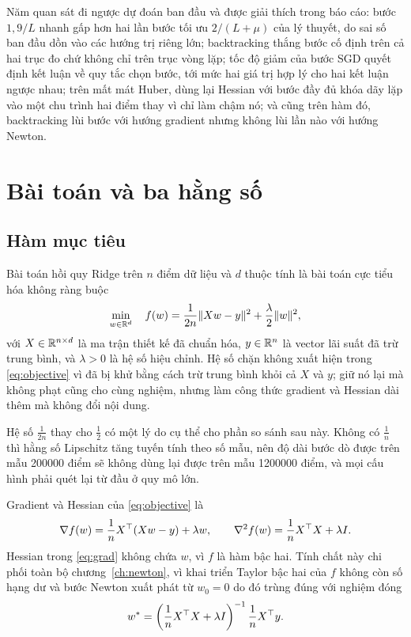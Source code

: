 \documentclass[12pt, a4paper, oneside]{report}
\theoremstyle{definition}
\begin{document}
Năm quan sát đi ngược dự đoán ban đầu và được giải thích trong báo cáo: bước
$1{,}9/L$ nhanh gấp hơn hai lần bước tối ưu $2/(L+\mu)$ của lý thuyết, do sai số
ban đầu dồn vào các hướng trị riêng lớn; backtracking thắng bước cố định trên cả
hai trục đo chứ không chỉ trên trục vòng lặp; tốc độ giảm của bước SGD quyết định
kết luận về quy tắc chọn bước, tới mức hai giá trị hợp lý cho hai kết luận ngược
nhau; trên mất mát Huber, dùng lại Hessian với bước đầy đủ khóa dãy lặp vào một
chu trình hai điểm thay vì chỉ làm chậm nó; và cũng trên hàm đó, backtracking lùi
bước với hướng gradient nhưng không lùi lần nào với hướng Newton.

\tableofcontents

\chapter{Bài toán và ba hằng số}

\section{Hàm mục tiêu}

Bài toán hồi quy Ridge \cite{hoerl1970ridge} trên $n$ điểm dữ liệu và $d$ thuộc
tính là bài toán cực tiểu hóa không ràng buộc
\begin{equation}\label{eq:objective}
  \min_{w \in \mathbb{R}^{d}} \quad f(w) = \frac{1}{2n} \lVert Xw - y\rVert^{2} + \frac{\lambda}{2} \lVert w\rVert^{2},
\end{equation}
với $X \in \mathbb{R}^{n \times d}$ là ma trận thiết kế đã chuẩn hóa, $y \in \mathbb{R}^{n}$ là
vector lãi suất đã trừ trung bình, và $\lambda > 0$ là hệ số hiệu chỉnh. Hệ số
chặn không xuất hiện trong \eqref{eq:objective} vì đã bị khử bằng cách trừ trung
bình khỏi cả $X$ và $y$; giữ nó lại mà không phạt cũng cho cùng nghiệm, nhưng làm
công thức gradient và Hessian dài thêm mà không đổi nội dung.

Hệ số $\frac{1}{2n}$ thay cho $\frac{1}{2}$ có một lý do cụ thể cho phần so sánh
sau này. Không có $\frac{1}{n}$ thì hằng số Lipschitz tăng tuyến tính theo số
mẫu, nên độ dài bước dò được trên mẫu \num{200000} điểm sẽ không dùng lại được
trên mẫu \num{1200000} điểm, và mọi cấu hình phải quét lại từ đầu ở quy mô lớn.

Gradient và Hessian của \eqref{eq:objective} là
\begin{equation}\label{eq:grad}
  \nabla f(w) = \frac{1}{n} X^{\top} (Xw - y) + \lambda w,
  \qquad
  \nabla^{2} f(w) = \frac{1}{n} X^{\top} X + \lambda I.
\end{equation}
Hessian trong \eqref{eq:grad} không chứa $w$, vì $f$ là hàm bậc hai. Tính chất
này chi phối toàn bộ chương~\ref{ch:newton}, vì khai triển Taylor bậc hai của $f$
không còn số hạng dư và bước Newton xuất phát từ $w_{0} = 0$ do đó trùng đúng với
nghiệm đóng
\begin{equation}\label{eq:closed}
  w^{*} = \left( \frac{1}{n} X^{\top} X + \lambda I \right)^{-1} \frac{1}{n} X^{\top} y .
\end{equation}
\end{document}
